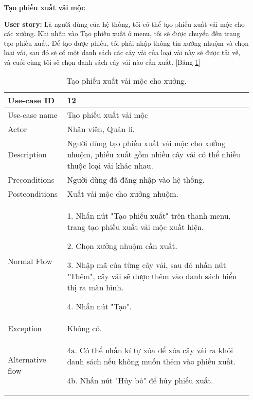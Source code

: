\textbf{Tạo phiếu xuất vải mộc}\par
\textbf{User story:} Là người dùng của hệ thống, tôi có thể tạo phiếu xuất vải mộc cho các xưởng. Khi nhấn vào Tạo phiếu xuất ở menu, tôi sẽ được chuyển đến trang tạo phiếu xuất. Để tạo được phiếu, tôi phải nhập thông tin xưởng nhuộm và chọn loại vải, sau đó sẽ có một danh sách các cây vải của loại vải này sẽ được tải về, và cuối cùng tôi sẽ chọn danh sách cây vải nào cần xuất. [Bảng \ref{bang9}]
\begin{table}[H]
    \centering
    \begin{tabular}{|m{3cm}|m{10cm}|}
    \hline 
        Use-case ID & 12\\ \hline
        Use-case name & Tạo phiếu xuất vải mộc\\ \hline
        Actor & Nhân viên, Quản lí.\\ \hline
        Description & Người dùng tạo phiếu xuất vải mộc cho xưởng nhuộm, phiếu xuất gồm nhiều cây vải có thể nhiều thuộc loại vải khác nhau.\\ \hline
        Preconditions & Người dùng đã đăng nhập vào hệ thống.
        \\ \hline
        Postconditions & Xuất vải mộc cho xưởng nhuộm.\\ \hline
        Normal Flow & 
        1. Nhấn nút "Tạo phiếu xuất" trên thanh menu, trang tạo phiếu xuất vải mộc xuất hiện.\par
        2. Chọn xưởng nhuộm cần xuất.\par
        3. Nhập mã của từng cây vải, sau đó nhấn nút "Thêm", cây vải sẽ được thêm vào danh sách hiển thị ra màn hình.\par
        4. Nhấn nút "Tạo".
        \\ \hline
        Exception & Không có.
        \\ \hline
        Alternative flow & 
        4a. Có thể nhấn kí tự xóa để xóa cây vải ra khỏi danh sách nếu không muốn thêm vào phiếu xuất.\par
        4b. Nhấn nút "Hủy bỏ" để hủy phiếu xuất.
        \\ 
    \hline 
    \end{tabular}
    \caption{Tạo phiếu xuất vải mộc cho xưởng.}
    \label{bang9}
\end{table}


